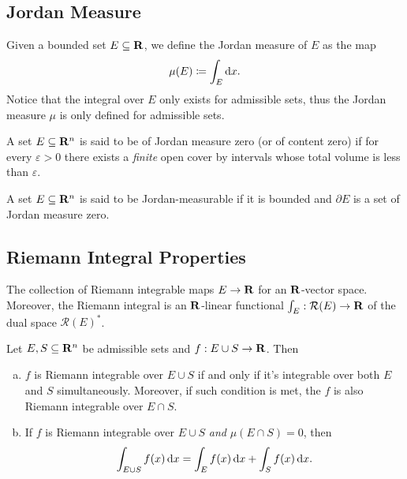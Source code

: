 \subsection{Jordan Measure}

\begin{definition}
\label{def:jordan-measure}
Given a bounded set \(E \subseteq \mathbf{R}\), we define the Jordan measure of \(E\) as
the map
\[
  \mu(E) \coloneq \int_E \mathrm{d} x.
\]
Notice that the integral over \(E\) only exists for admissible sets, thus the
Jordan measure \(\mu\) is only defined for admissible sets.
\end{definition}

\begin{definition}
\label{def:jordan-measure-zero}
A set \(E \subseteq \mathbf{R}^n\) is said to be of Jordan measure zero (or of content
zero) if for every \(\varepsilon > 0\) there exists a \emph{finite} open cover
by intervals whose total volume is less than \(\varepsilon\).
\end{definition}

\begin{definition}
\label{def:jordan-measurable}
A set \(E \subseteq \mathbf{R}^n\) is said to be Jordan-measurable if it is bounded and
\(\partial E\) is a set of Jordan measure zero.
\end{definition}

\subsection{Riemann Integral Properties}

\begin{corollary}
The collection of Riemann integrable maps \(E \to \mathbf{R}\) for an \(\mathbf{R}\)-vector
space. Moreover, the Riemann integral is an \(\mathbf{R}\)-linear functional \(\int_E:
\mathcal R(E) \to \mathbf{R}\) of the dual space \(\mathcal R(E)^{*}\).
\end{corollary}

\begin{proposition}
\label{prop:domain-relations-riemann-integral}
Let \(E, S \subseteq \mathbf{R}^n\) be admissible sets and \(f: E \cup S \to \mathbf{R}\). Then
\begin{enumerate}[(a)]\setlength\itemsep{0em}
\item \(f\) is Riemann integrable over \(E \cup S\) if and only if it's
  integrable over both \(E\) and \(S\) simultaneously. Moreover, if such
  condition is met, the \(f\) is also Riemann integrable over \(E \cap S\).
\item If \(f\) is Riemann integrable over \(E \cup S\) \emph{and} \(\mu(E \cap
  S) = 0\), then
  \[
    \int_{E \cup S} f(x)\, \mathrm{d} x = \int_E f(x)\, \mathrm{d} x + \int_S f(x)\, \mathrm{d} x.
  \]
\end{enumerate}
\end{proposition}

